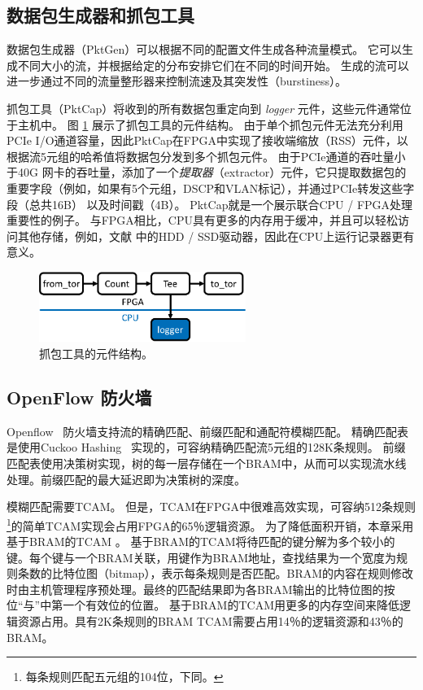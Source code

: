 \subsection{数据包生成器和抓包工具}
数据包生成器（PktGen）可以根据不同的配置文件生成各种流量模式。
它可以生成不同大小的流，并根据给定的分布安排它们在不同的时间开始。
生成的流可以进一步通过不同的流量整形器来控制流速及其突发性（burstiness）。

抓包工具（PktCap）将收到的所有数据包重定向到 \textit {logger} 元件，这些元件通常位于主机中。
图 \ref{clicknp:fig:packet-capture} 展示了抓包工具的元件结构。
由于单个抓包元件无法充分利用PCIe I/O通道容量，因此PktCap在FPGA中实现了接收端缩放（RSS）元件，以根据流5元组的哈希值将数据包分发到多个抓包元件。
由于PCIe通道的吞吐量小于40G 网卡的吞吐量，添加了一个\textit {提取器}（extractor）元件，它只提取数据包的重要字段（例如，如果有5个元组，DSCP和VLAN标记），并通过PCIe转发这些字段（总共16B） 以及时间戳（4B）。
PktCap就是一个展示联合CPU / FPGA处理重要性的例子。
与FPGA相比，CPU具有更多的内存用于缓冲，并且可以轻松访问其他存储，例如，文献 \cite{lee2015flosis} 中的HDD / SSD驱动器，因此在CPU上运行记录器更有意义。


\begin{figure}[htbp]
	\centering
	\includegraphics[width=0.6\textwidth]{image/packet-capture}
	\caption{抓包工具的元件结构。}
	\label{clicknp:fig:packet-capture}
\end{figure}


\subsection{OpenFlow 防火墙}
Openflow~\cite {mckeown2008openflow} 防火墙支持流的精确匹配、前缀匹配和通配符模糊匹配。
精确匹配表是使用Cuckoo Hashing~\cite{cuckoo} 实现的，可容纳精确匹配流5元组的128K条规则。
前缀匹配表使用决策树实现，树的每一层存储在一个BRAM中，从而可以实现流水线处理。前缀匹配的最大延迟即为决策树的深度。

模糊匹配需要TCAM。
但是，TCAM在FPGA中很难高效实现，可容纳512条规则\footnote{每条规则匹配五元组的104位，下同。}的简单TCAM实现会占用FPGA的65％逻辑资源。
为了降低面积开销，本章采用基于BRAM的TCAM \cite {jiang2013scalable}。
基于BRAM的TCAM将待匹配的键分解为多个较小的键。每个键与一个BRAM关联，用键作为BRAM地址，查找结果为一个宽度为规则条数的比特位图（bitmap），表示每条规则是否匹配。BRAM的内容在规则修改时由主机管理程序预处理。最终的匹配结果即为各BRAM输出的比特位图的按位``与''中第一个有效位的位置。
基于BRAM的TCAM用更多的内存空间来降低逻辑资源占用。具有2K条规则的BRAM TCAM需要占用14％的逻辑资源和43％的BRAM。

